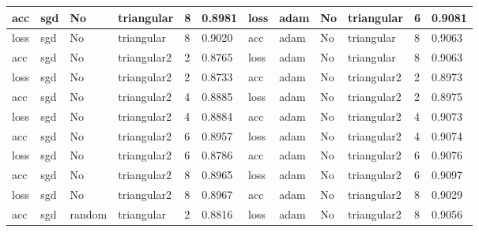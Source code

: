 \begin{table}[H]
\begin{adjustbox}{width=1\textwidth}
\begin{tabular}{|l|l|l|l|l|l||l|l|l|l|l|l|}
acc           & sgd          & No          & triangular       & 8             & 0.8981            & loss          & adam         & No          & triangular       & 6             & 0.9081            \\ \hline
loss          & sgd          & No          & triangular       & 8             & 0.9020            & acc           & adam         & No          & triangular       & 8             & 0.9063            \\ \hline
acc           & sgd          & No          & triangular2      & 2             & 0.8765            & loss          & adam         & No          & triangular       & 8             & 0.9063            \\ \hline
loss          & sgd          & No          & triangular2      & 2             & 0.8733            & acc           & adam         & No          & triangular2      & 2             & 0.8973            \\ \hline
acc           & sgd          & No          & triangular2      & 4             & 0.8885            & loss          & adam         & No          & triangular2      & 2             & 0.8975            \\ \hline
loss          & sgd          & No          & triangular2      & 4             & 0.8884            & acc           & adam         & No          & triangular2      & 4             & 0.9073            \\ \hline
acc           & sgd          & No          & triangular2      & 6             & 0.8957            & loss          & adam         & No          & triangular2      & 4             & 0.9074            \\ \hline
loss          & sgd          & No          & triangular2      & 6             & 0.8786            & acc           & adam         & No          & triangular2      & 6             & 0.9076            \\ \hline
acc           & sgd          & No          & triangular2      & 8             & 0.8965            & loss          & adam         & No          & triangular2      & 6             & 0.9097            \\ \hline
loss          & sgd          & No          & triangular2      & 8             & 0.8967            & acc           & adam         & No          & triangular2      & 8             & 0.9029            \\ \hline
acc           & sgd          & random        & triangular       & 2             & 0.8816            & loss          & adam         & No          & triangular2      & 8             & 0.9056            \\ \hline

\end{tabular}
\end{adjustbox}
\end{table}

